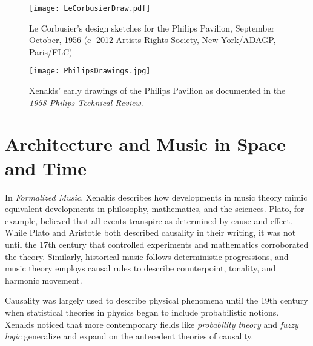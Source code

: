 \begin{figure}[]
  \texttt{[image: LeCorbusierDraw.pdf]}
  \caption{Le Corbusier's design sketches for the Philips Pavilion,
    September \textendash{} October, 1956 (\textcircled{c} 2012
    Artists Rights Society, New York/ADAGP, Paris/FLC)}
  \label{fig:le-corbusier-sketch}
\end{figure}

\begin{figure}[]
  \texttt{[image: PhilipsDrawings.jpg]}
  \caption{Xenakis' early drawings of the Philips Pavilion as
    documented in the \textit{1958 Philips Technical Review}.}
  \label{fig:xenakis-draw}
\end{figure}

\section{Architecture and Music in Space and Time}
\label{sec:introduction-conclusion}

In \textit{Formalized Music},\cite{xenakis1992formalized} Xenakis
describes how developments in music theory mimic equivalent
developments in philosophy, mathematics, and the sciences. Plato, for
example, believed that all events transpire as determined by cause and
effect. While Plato and Aristotle both described causality in their
writing, it was not until the 17th century that controlled experiments
and mathematics corroborated the theory.
Similarly, historical music follows deterministic progressions, and
music theory employs causal rules to describe counterpoint, tonality,
and harmonic movement.

Causality was largely used to describe physical phenomena until the
19th century when statistical theories in physics began to include
probabilistic notions. Xenakis
noticed that more contemporary fields like \emph{probability theory}
and \emph{fuzzy logic} generalize and expand on the antecedent
theories of causality.

